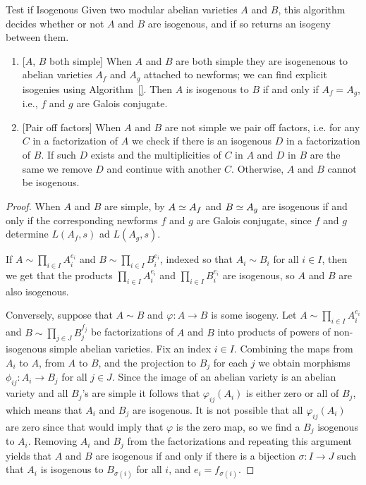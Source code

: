 \documentclass{article}
\begin{document}
\begin{algorithm}{Test if Isogenous}
	Given two modular abelian varieties $A$ and $B$, this
	algorithm decides whether or not $A$ and $B$ are isogenous, and if
	so returns an isogeny between them.

	\begin{enumerate}
		\item{} [$A$, $B$ both simple] When $A$ and $B$ are both simple they
		      are isogenenous to abelian varieties $A_f$ and $A_g$ attached to
		      newforms; we can find explicit isogenies using Algorithm~\ref{}.
		      Then $A$ is isogenous to $B$ if and only if $A_f = A_g$, i.e., $f$
		      and $g$ are Galois conjugate.


		\item{} [Pair off factors] When $A$ and $B$ are not simple we pair off
		      factors, i.e. for any $C$ in a factorization of $A$ we check if
		      there is an isogenous $D$ in a factorization of $B$. If such $D$
		      exists and the multiplicities of $C$ in $ A$ and $D$ in $B$ are the
		      same we remove $D$ and continue with another $C$. Otherwise, $A$ and
		      $B$ cannot be isogenous.
	\end{enumerate}
\end{algorithm}
\begin{proof}
	When $A$ and $B$ are simple, by \cite[\S5]{faltings:finiteness}
	$A\simeq A_f$ and $B\simeq A_g$ are isogenous if and only if the
	corresponding newforms $f$ and $g$ are Galois conjugate,
	since $f$ and $g$ determine $L(A_f,s)$ ad $L(A_g,s)$.

	If $A \sim \prod_{i \in I} A_i^{e_i}$ and $B \sim \prod_{i \in I}
		B_i^{e_i}$, indexed so that $A_i \sim B_i$ for all $i \in I$, then we
	get that the products $\prod_{i \in I} A_i^{e_i}$ and $\prod_{i \in I}
		B_i^{e_i}$ are isogenous, so $A$ and $B$ are also isogenous.

	Conversely, suppose that $A \sim B$ and $\varphi: A \to B$ is some
	isogeny.  Let $A \sim \prod_{i \in I} A_i^{e_i}$ and $B \sim
		\prod_{j \in J} B_j^{f_j}$ be factorizations of $A$ and $B$ into
	products of powers of non-isogenous simple abelian varieties. Fix an
	index $i \in I$.  Combining the maps from $A_i$ to $A$, from $A$ to
	$B$, and the projection to $B_j$ for each $j$ we obtain morphisms
	$\phi_{ij}: A_i \to B_j$ for all $j \in J$. Since the image of an
	abelian variety is an abelian variety and all $B_j$'s are simple it
	follows that $\varphi_{ij}(A_i)$ is either zero or all of $B_j$,
	which means that $A_i$ and $B_j$ are isogenous. It is not possible
	that all $\varphi_{ij}(A_i)$ are zero since that would imply that
	$\varphi$ is the zero map, so we find a $B_j$ isogenous to
	$A_i$. Removing $A_i$ and $B_j$ from the factorizations and
	repeating this argument yields that $A$ and $B$ are isogenous if and
	only if there is a bijection $\sigma:I\to J$ such that $A_i$ is
	isogenous to $B_{\sigma(i)}$ for all $i$, and $e_i = f_{\sigma(i)}$.
\end{proof}
\end{document}
